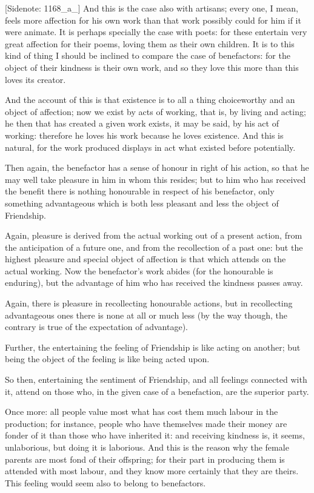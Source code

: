 [Sidenote: 1168_a_] And this is the case also with artisans; every one,
I mean, feels more affection for his own work than that work possibly
could for him if it were animate. It is perhaps specially the case with
poets: for these entertain very great affection for their poems, loving
them as their own children. It is to this kind of thing I should be
inclined to compare the case of benefactors: for the object of their
kindness is their own work, and so they love this more than this loves
its creator.

And the account of this is that existence is to all a thing choiceworthy
and an object of affection; now we exist by acts of working, that is, by
living and acting; he then that has created a given work exists, it may
be said, by his act of working: therefore he loves his work because he
loves existence. And this is natural, for the work produced displays in
act what existed before potentially.

Then again, the benefactor has a sense of honour in right of his action,
so that he may well take pleasure in him in whom this resides; but to
him who has received the benefit there is nothing honourable in respect
of his benefactor, only something advantageous which is both less
pleasant and less the object of Friendship.

Again, pleasure is derived from the actual working out of a present
action, from the anticipation of a future one, and from the recollection
of a past one: but the highest pleasure and special object of affection
is that which attends on the actual working. Now the benefactor's work
abides (for the honourable is enduring), but the advantage of him who
has received the kindness passes away.

Again, there is pleasure in recollecting honourable actions, but in
recollecting advantageous ones there is none at all or much less (by the
way though, the contrary is true of the expectation of advantage).

Further, the entertaining the feeling of Friendship is like acting on
another; but being the object of the feeling is like being acted upon.

So then, entertaining the sentiment of Friendship, and all feelings
connected with it, attend on those who, in the given case of a
benefaction, are the superior party.

Once more: all people value most what has cost them much labour in the
production; for instance, people who have themselves made their money
are fonder of it than those who have inherited it: and receiving
kindness is, it seems, unlaborious, but doing it is laborious. And this
is the reason why the female parents are most fond of their offspring;
for their part in producing them is attended with most labour, and they
know more certainly that they are theirs. This feeling would seem also
to belong to benefactors.

